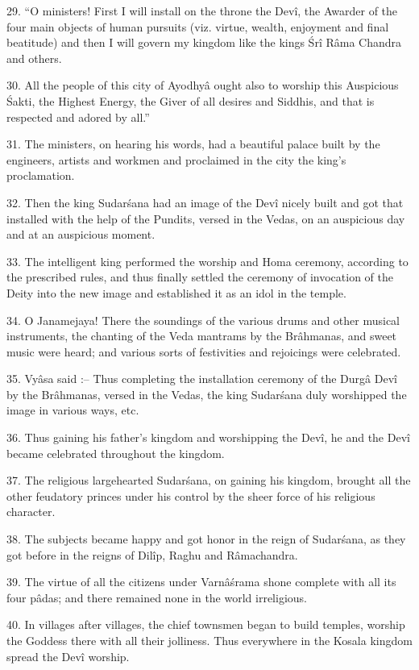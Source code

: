 29. ``O ministers! First I will install on the throne the Dev\^i, the Awarder of the four main objects of human pursuits (viz. virtue, wealth, enjoyment and final beatitude) and then I will govern my kingdom like the kings \'Sr\^i R\^ama Chandra and others.

30. All the people of this city of Ayodhy\^a ought also to worship this Auspicious \'Sakti, the Highest Energy, the Giver of all desires and Siddhis, and that is respected and adored by all.''

31. The ministers, on hearing his words, had a beautiful palace built by the engineers, artists and workmen and proclaimed in the city the king's proclamation.

32. Then the king Sudar\'sana had an image of the Dev\^i nicely built and got that installed with the help of the Pundits, versed in the Vedas, on an auspicious day and at an auspicious moment.

33. The intelligent king performed the worship and Homa ceremony, according to the prescribed rules, and thus finally settled the ceremony of invocation of the Deity into the new image and established it as an idol in the temple.

34. O Janamejaya! There the soundings of the various drums and other musical instruments, the chanting of the Veda mantrams by the Br\^ahmanas, and sweet music were heard; and various sorts of festivities and rejoicings were celebrated.

35. Vy\^asa said :-- Thus completing the installation ceremony of the Durg\^a Dev\^i by the Br\^ahmanas, versed in the Vedas, the king Sudar\'sana duly worshipped the image in various ways, etc.

36. Thus gaining his father's kingdom and worshipping the Dev\^i, he and the Dev\^i became celebrated throughout the kingdom.

37. The religious largehearted Sudar\'sana, on gaining his kingdom, brought all the other feudatory princes under his control by the sheer force of his religious character.

38. The subjects became happy and got honor in the reign of Sudar\'sana, as they got before in the reigns of Dil\^ip, Raghu and R\^amachandra.

39. The virtue of all the citizens under Varn\^a\'srama shone complete with all its four p\^adas; and there remained none in the world irreligious.

40. In villages after villages, the chief townsmen began to build temples, worship the Goddess there with all their jolliness. Thus everywhere in the Kosala kingdom spread the Dev\^i worship.

